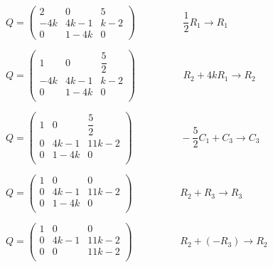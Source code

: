 \documentclass[fleqn]{article}
\begin{document}
\begin{enumerate}
      \textcolor{hwColor}{
        $
        Q = 
          \begin{pmatrix}
          2 & 0 & 5 \\
          -4k & 4k-1 & k-2 \\
          0 & 1-4k & 0
          \end{pmatrix}
          \hspace{2cm} \dfrac{1}{2}R_1 \longrightarrow R_1 \hspace{2cm}
        $
      }

      \textcolor{hwColor}{
        $
          Q=\begin{pmatrix}
            1 & 0 & \dfrac{5}{2} \\
            -4k & 4k-1 & k-2 \\
            0 & 1-4k & 0 \\
          \end{pmatrix}
          \hspace{2cm} R_2+4kR_1 \longrightarrow R_2 \hspace{1cm}
        $
      }

      \textcolor{hwColor}{
        $
          Q=\begin{pmatrix}
          1 & 0 & \dfrac{5}{2} \\
          0 & 4k-1 & 11k-2 \\
          0 & 1-4k & 0 \\
        \end{pmatrix}
        \hspace{2cm} -\dfrac{5}{2}C_1+C_3 \longrightarrow C_3
        $
      }

      \textcolor{hwColor}{
        $
          Q=\begin{pmatrix}
          1 & 0 & 0 \\
          0 & 4k-1 & 11k-2 \\
          0 & 1-4k & 0 \\
        \end{pmatrix}
        \hspace{2cm} R_2+R_3 \longrightarrow R_3
        $
      }

      \textcolor{hwColor}{
        $
          Q=\begin{pmatrix}
          1 & 0 & 0 \\
          0 & 4k-1 & 11k-2 \\
          0 & 0 & 11k-2 \\
        \end{pmatrix}
        \hspace{2cm} R_2+(-R_3) \longrightarrow R_2
        $
      }


\end{enumerate}
\end{document}
